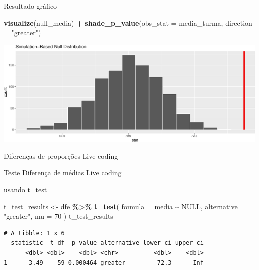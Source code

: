 \documentclass[
  9pt,
  ignorenonframetext,
  aspectratio=169]{beamer}
\newenvironment{Shaded}{\begin{snugshade}}{\end{snugshade}}
\newcommand{\DataTypeTok}[1]{\textcolor[rgb]{0.13,0.29,0.53}{#1}}
\newcommand{\DecValTok}[1]{\textcolor[rgb]{0.00,0.00,0.81}{#1}}
\newcommand{\KeywordTok}[1]{\textcolor[rgb]{0.13,0.29,0.53}{\textbf{#1}}}
\newcommand{\NormalTok}[1]{#1}
\newcommand{\OperatorTok}[1]{\textcolor[rgb]{0.81,0.36,0.00}{\textbf{#1}}}
\newcommand{\OtherTok}[1]{\textcolor[rgb]{0.56,0.35,0.01}{#1}}
\newcommand{\StringTok}[1]{\textcolor[rgb]{0.31,0.60,0.02}{#1}}
\begin{document}
\begin{frame}[fragile]{Resultado gráfico}
\protect\hypertarget{resultado-gruxe1fico}{}
\begin{Shaded}
\begin{Highlighting}[]
\KeywordTok{visualize}\NormalTok{(null\_media) }\OperatorTok{+}\StringTok{ }\KeywordTok{shade\_p\_value}\NormalTok{(}\DataTypeTok{obs\_stat =}\NormalTok{ media\_turma, }\DataTypeTok{direction =} \StringTok{"greater"}\NormalTok{)}
\end{Highlighting}
\end{Shaded}

\includegraphics{aula_10_files/figure-beamer/unnamed-chunk-7-1.pdf}
\end{frame}

\begin{frame}{Diferenças de proporções}
\protect\hypertarget{diferenuxe7as-de-proporuxe7uxf5es}{}
Live coding
\end{frame}

\begin{frame}{Teste Diferença de médias}
\protect\hypertarget{teste-diferenuxe7a-de-muxe9dias}{}
Live coding
\end{frame}

\begin{frame}[fragile]{usando t\_test}
\protect\hypertarget{usando-t_test}{}
\begin{Shaded}
\begin{Highlighting}[]
\NormalTok{t\_test\_results \textless{}{-}}\StringTok{ }\NormalTok{dfe }\OperatorTok{\%\textgreater{}\%}
\StringTok{  }\KeywordTok{t\_test}\NormalTok{(}
    \DataTypeTok{formula =}\NormalTok{ media }\OperatorTok{\textasciitilde{}}\StringTok{ }\OtherTok{NULL}\NormalTok{,}
    \DataTypeTok{alternative =} \StringTok{"greater"}\NormalTok{,}
    \DataTypeTok{mu =} \DecValTok{70}
\NormalTok{  )}
\NormalTok{t\_test\_results}
\end{Highlighting}
\end{Shaded}

\begin{verbatim}
# A tibble: 1 x 6
  statistic  t_df  p_value alternative lower_ci upper_ci
      <dbl> <dbl>    <dbl> <chr>          <dbl>    <dbl>
1      3.49    59 0.000464 greater         72.3      Inf
\end{verbatim}
\end{frame}
\end{document}
